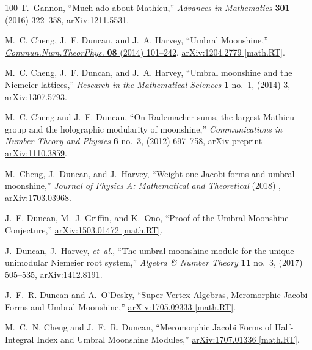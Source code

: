 \documentclass[11pt,a4paper,fontset=windows]{ctexart}
\numberwithin{equation}{section}
\begin{document}
\begin{thebibliography}{100}
T.~Gannon, ``Much ado about {M}athieu,'' {\em Advances in Mathematics}
  {\bfseries 301} (2016) 322--358,
  \href{http://arxiv.org/abs/arXiv:1211.5531}{{\ttfamily arXiv:1211.5531}}.

M.~C. Cheng, J.~F. Duncan, and J.~A. Harvey, ``{Umbral Moonshine},''
  \href{http://dx.doi.org/10.4310/CNTP.2014.v8.n2.a1}{{\em
  Commun.Num.TheorPhys.} {\bfseries 08} (2014) 101--242},
  \href{http://arxiv.org/abs/1204.2779}{{\ttfamily arXiv:1204.2779 [math.RT]}}.

M.~C. Cheng, J.~F. Duncan, and J.~A. Harvey, ``{Umbral moonshine and the
  Niemeier lattices},'' {\em Research in the Mathematical Sciences} {\bfseries
  1} no.~1, (2014) 3, \href{http://arxiv.org/abs/arXiv:1307.5793}{{\ttfamily
  arXiv:1307.5793}}.

M.~C. Cheng and J.~F. Duncan, ``{On Rademacher sums, the largest Mathieu group
  and the holographic modularity of moonshine},'' {\em Communications in Number
  Theory and Physics} {\bfseries 6} no.~3, (2012) 697--758,
  \href{http://arxiv.org/abs/arXiv preprint arXiv:1110.3859}{{\ttfamily arXiv
  preprint arXiv:1110.3859}}.

M.~Cheng, J.~Duncan, and J.~Harvey, ``{Weight one Jacobi forms and umbral
  moonshine},'' {\em Journal of Physics A: Mathematical and Theoretical} (2018)
  , \href{http://arxiv.org/abs/arXiv:1703.03968}{{\ttfamily arXiv:1703.03968}}.

J.~F. Duncan, M.~J. Griffin, and K.~Ono, ``{Proof of the Umbral Moonshine
  Conjecture},'' \href{http://arxiv.org/abs/1503.01472}{{\ttfamily
  arXiv:1503.01472 [math.RT]}}.

J.~Duncan, J.~Harvey, {\em et~al.}, ``{The umbral moonshine module for the
  unique unimodular Niemeier root system},'' {\em Algebra \& Number Theory}
  {\bfseries 11} no.~3, (2017) 505--535,
  \href{http://arxiv.org/abs/arXiv:1412.8191}{{\ttfamily arXiv:1412.8191}}.

J.~F.~R. Duncan and A.~O'Desky, ``{Super Vertex Algebras, Meromorphic Jacobi
  Forms and Umbral Moonshine},''
\href{http://arxiv.org/abs/1705.09333}{{\ttfamily arXiv:1705.09333 [math.RT]}}.

M.~C.~N. Cheng and J.~F.~R. Duncan, ``{Meromorphic Jacobi Forms of
  Half-Integral Index and Umbral Moonshine Modules},''
\href{http://arxiv.org/abs/1707.01336}{{\ttfamily arXiv:1707.01336 [math.RT]}}.


\end{thebibliography}
\end{document}

